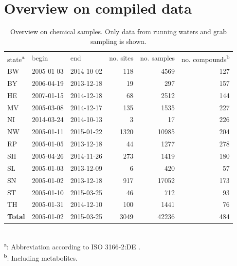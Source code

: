 \documentclass[pdftex,a4paper]{scrreprt}
\begin{document}
\chapter{Overview on compiled data}

\begin{table}[htbp]
\caption{Overview on chemical samples. Only data from running waters and grab sampling is shown.}
\begin{tabular}{lllrrr}
state\textsuperscript{a} & begin & end & no. sites & no. samples & no. compounds\textsuperscript{b} \\
BW & 2005-01-03 & 2014-10-02 & 118 & 4569 & 127 \\ 
BY & 2006-04-19 & 2013-12-18 & 19 & 297 & 157 \\ 
HE & 2007-01-15 & 2014-12-18 & 68 & 2512 & 144 \\ 
MV & 2005-03-08 & 2014-12-17 & 135 & 1535 & 227 \\ 
NI & 2014-03-24 & 2014-10-13 & 3 & 17 & 226 \\ 
NW & 2005-01-11 & 2015-01-22 & 1320 & 10985 & 204 \\ 
RP & 2005-01-05 & 2013-12-18 & 44 & 1277 & 278 \\ 
SH & 2005-04-26 & 2014-11-26 & 273 & 1419 & 180 \\ 
SL & 2005-01-03 & 2013-12-09 & 6 & 420 & 57 \\ 
SN & 2005-01-02 & 2013-12-18 & 917 & 17052 & 173 \\ 
ST & 2005-01-10 & 2015-03-25 & 46 & 712 & 93 \\ 
TH & 2005-01-31 & 2014-12-10 & 100 & 1441 & 76 \\ \hline
\textbf{Total} & 2005-01-02 & 2015-03-25 & 3049 & 42236 & 484 \\  \hline
\end{tabular}
\\[1em]
\textsuperscript{a}: Abbreviation according to ISO 3166-2:DE .\\
\textsuperscript{b}: Including metabolites.
\label{tab:phch}
\end{table}



\end{document}

